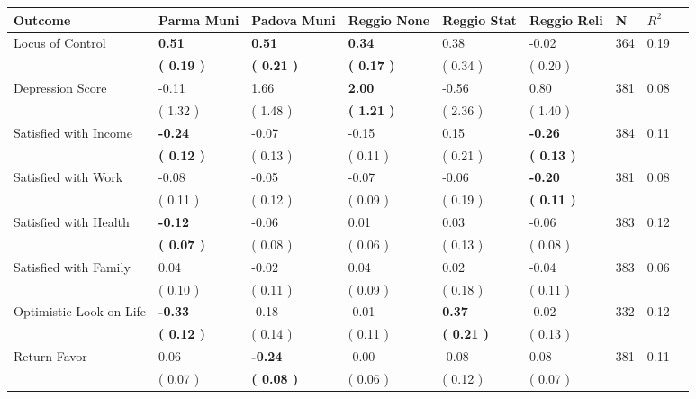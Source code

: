\begin{tabular}{L{6.2cm} C{1.8cm} C{1.8cm} C{1.8cm} C{1.8cm} C{1.8cm} C{1.8cm} C{0.3cm} C{0.3cm}}
\toprule
 \textbf{Outcome} & \textbf{Parma Muni} & \textbf{Padova Muni} & \textbf{Reggio None} & \textbf{Reggio Stat} & \textbf{Reggio Reli} & \textbf{N} & \textbf{$ R^2$} \\
\midrule
Locus of Control & \textbf{     0.51} & \textbf{     0.51} & \textbf{     0.34} &      0.38 &     -0.02  & 364 &       0.19 \\ 
 & \textbf{(     0.19 )} & \textbf{(     0.21 )} & \textbf{(     0.17 )} & (     0.34 ) & (     0.20 )  & \\
Depression Score &     -0.11 &      1.66 & \textbf{     2.00} &     -0.56 &      0.80  & 381 &       0.08 \\ 
 & (     1.32 ) & (     1.48 ) & \textbf{(     1.21 )} & (     2.36 ) & (     1.40 )  & \\
Satisfied with Income & \textbf{    -0.24} &     -0.07 &     -0.15 &      0.15 & \textbf{    -0.26}  & 384 &       0.11 \\ 
 & \textbf{(     0.12 )} & (     0.13 ) & (     0.11 ) & (     0.21 ) & \textbf{(     0.13 )}  & \\
Satisfied with Work &     -0.08 &     -0.05 &     -0.07 &     -0.06 & \textbf{    -0.20}  & 381 &       0.08 \\ 
 & (     0.11 ) & (     0.12 ) & (     0.09 ) & (     0.19 ) & \textbf{(     0.11 )}  & \\
Satisfied with Health & \textbf{    -0.12} &     -0.06 &      0.01 &      0.03 &     -0.06  & 383 &       0.12 \\ 
 & \textbf{(     0.07 )} & (     0.08 ) & (     0.06 ) & (     0.13 ) & (     0.08 )  & \\
Satisfied with Family &      0.04 &     -0.02 &      0.04 &      0.02 &     -0.04  & 383 &       0.06 \\ 
 & (     0.10 ) & (     0.11 ) & (     0.09 ) & (     0.18 ) & (     0.11 )  & \\
Optimistic Look on Life & \textbf{    -0.33} &     -0.18 &     -0.01 & \textbf{     0.37} &     -0.02  & 332 &       0.12 \\ 
 & \textbf{(     0.12 )} & (     0.14 ) & (     0.11 ) & \textbf{(     0.21 )} & (     0.13 )  & \\
Return Favor &      0.06 & \textbf{    -0.24} &     -0.00 &     -0.08 &      0.08  & 381 &       0.11 \\ 
 & (     0.07 ) & \textbf{(     0.08 )} & (     0.06 ) & (     0.12 ) & (     0.07 )  & \\

\end{tabular}
